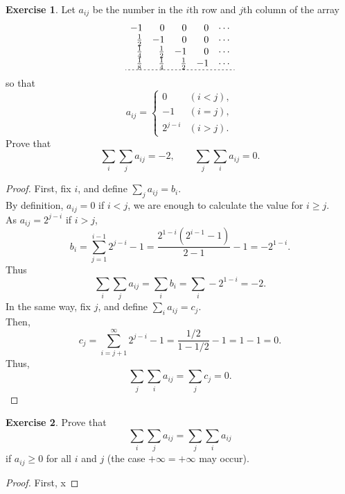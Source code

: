 \documentclass[12pt]{book}
\theoremstyle{definition}
\newtheorem{exe}{Exercise}
\begin{document}
	\newpage
	\begin{exe}
		Let $a_{ij}$ be the number in the $i$th row and $j$th column of the array
		\begin{equation*}
			\begin{matrix*}[r]
				-1&0&0&0&\cdots\\
				\frac{1}{2}&-1&0&0&\cdots\\
				\frac{1}{4}&\frac{1}{2}&-1&0&\cdots\\
				\frac{1}{8}&\frac{1}{4}&\frac{1}{2}&-1&\cdots\\
				\hdashline[2pt/2pt]
			\end{matrix*}
		\end{equation*}
		so that
		\begin{equation*}
			a_{ij}=\begin{cases}
				0&(i<j),\\
				-1&(i=j),\\
				2^{j-i}&(i>j).
			\end{cases}
		\end{equation*}
		Prove that
		\begin{equation*}
			\sum_i \sum_j a_{ij}=-2,\qquad \sum_j\sum_i a_{ij}=0.
		\end{equation*}
	\end{exe}
	\begin{proof}
		First, fix $i$, and define $\sum_j a_{ij}=b_i$.\\
		By definition, $a_{ij}=0$ if $i<j$, we are enough to calculate the value for $i\geq j$.\\
		As $a_{ij}=2^{j-i}$ if $i>j$, $$b_i=\sum_{j=1} ^ {i-1} 2^{j-i}-1=\dfrac{2^{1-i}(2^{i-1}-1)}{2-1}-1=-2^{1-i}.$$
		Thus $$\displaystyle\sum_i \sum_j a_{ij}=\sum_i b_i=\sum_i -2^{1-i}=-2.$$
		In the same way, fix $j$, and define $\sum_i a_{ij}=c_j$.\\
		Then, $$c_j=\sum_{i=j+1}^{\infty} 2^{j-i} -1=\dfrac{1/2}{1-1/2}-1=1-1=0.$$
		Thus, $$\displaystyle\sum_j \sum_i a_{ij}=\sum_j c_j = 0.$$
	\end{proof}
	\newpage
	\begin{exe}
		Prove that
		\begin{equation*}
			\sum_i \sum_j a_{ij}=\sum_j\sum_i a_{ij}
		\end{equation*}
		if $a_{ij}\geq0$ for all $i$ and $j$ (the case $+\infty=+\infty$ may occur).
	\end{exe}
	\begin{proof}
		First,  x
	\end{proof}
	\newpage
	\setcounter{exe}{10}
\end{document}
